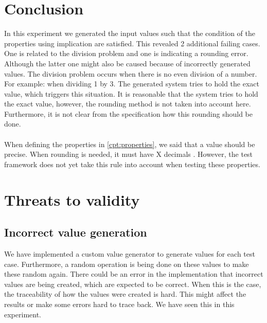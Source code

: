 \section{Conclusion}
In this experiment we generated the input values such that the condition of the properties using implication are satisfied. This revealed 2 additional failing cases. One is related to the division problem and one is indicating a rounding error. Although the latter one might also be caused because of incorrectly generated values. The division problem occurs when there is no even division of a number. For example: when dividing 1 by 3. The generated system tries to hold the exact value, which triggers this situation. It is reasonable that the system tries to hold the exact value, however, the rounding method is not taken into account here. Furthermore, it is not clear from the specification how this rounding should be done.\\
\\
When defining the properties in \autoref{cpt:properties}, we said that a value should be precise. When rounding is needed, it must have X decimals . However, the test framework does not yet take this rule into account when testing these properties.

\section{Threats to validity}

\subsection*{Incorrect value generation}
We have implemented a custom value generator to generate values for each test case. Furthermore, a random operation is being done on these values to make these random again. There could be an error in the implementation that incorrect values are being created, which are expected to be correct. When this is the case, the traceability of how the values were created is hard. This might affect the results or make some errors hard to trace back. We have seen this in this experiment.

